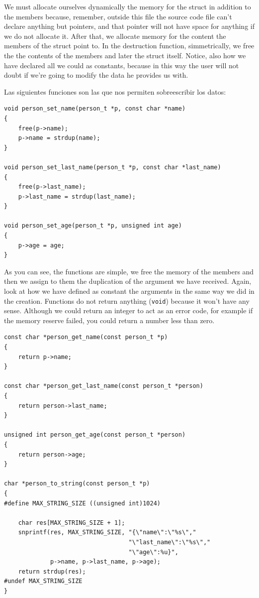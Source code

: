 \documentclass[a4paper]{article}
\begin{document}
We must allocate ourselves dynamically the memory for the struct in addition
to the members because, remember, outside this file the source code file can't
declare anything but pointers, and that pointer will not have space for anything
if we do not allocate it. After that, we allocate memory for the content the
members of the struct point to. In the destruction function, simmetrically,
we free the the contents of the members and later the struct itself. Notice,
also how we have declared all we could as constants, because in this way the
user will not doubt if we're going to modify the data he provides us with.

Las siguientes funciones son las que nos permiten sobreescribir los datos:

\noindent
\begin{minipage}[H]{\linewidth}
\mbox{}
\begin{lstlisting}[style=C, label={lst:finalExSetter},
caption={Final example of program -- \texttt{person.c} manipulation}]
void person_set_name(person_t *p, const char *name)
{
    free(p->name);
    p->name = strdup(name);
}

void person_set_last_name(person_t *p, const char *last_name)
{
    free(p->last_name);
    p->last_name = strdup(last_name);
}

void person_set_age(person_t *p, unsigned int age)
{
    p->age = age;
}
\end{lstlisting}
\end{minipage}

As you can see, the functions are simple, we free the memory of the members and
then we assign to them the duplication of the argument we have received. Again,
look at how we have defined as constant the arguments in the same way we did in
the creation. Functions do not return anything (\verb!void!) because it won't
have any sense. Although we could return an integer to act as an error code,
for example if the memory reserve failed, you could return a number less than
zero.

\noindent
\begin{minipage}[H]{\linewidth}
\mbox{}
\begin{lstlisting}[style=C, label={lst:finalExGetter},
caption={Final example of program -- \texttt{person.c} retrieval}]
const char *person_get_name(const person_t *p)
{
    return p->name;
}

const char *person_get_last_name(const person_t *person)
{
    return person->last_name;
}

unsigned int person_get_age(const person_t *person)
{
    return person->age;
}

char *person_to_string(const person_t *p)
{
#define MAX_STRING_SIZE ((unsigned int)1024)

    char res[MAX_STRING_SIZE + 1];
    snprintf(res, MAX_STRING_SIZE, "{\"name\":\"%s\","
                                   "\"last_name\":\"%s\","
                                   "\"age\":%u}",
             p->name, p->last_name, p->age);
    return strdup(res);
#undef MAX_STRING_SIZE
}
\end{lstlisting}
\end{minipage}
\end{document}
